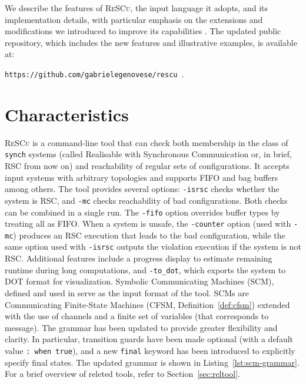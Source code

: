 We describe the features of \textsc{ReSCu}, the input language it adopts,
and its implementation details, with particular emphasis on the
extensions and modifications we introduced to improve its capabilities
\cite{rescuoriginalrepo}. The updated public repository, which includes
the new features and illustrative examples, is available at:
\begin{center}
\verb|https://github.com/gabrielegenovese/rescu|~\cite{rescurepo}.
\end{center}

\section{Characteristics}
\textsc{ReSCu} is a command-line tool that can check both membership in the 
class of \verb|synch| systems (called Realisable with Synchronous Communication 
or, in brief, RSC from now on) and reachability of regular sets of configurations. It 
accepts input systems with arbitrary topologies and supports FIFO and 
bag buffers among others. The tool provides several options: 
\verb|-isrsc| checks whether the system is RSC, and \verb|-mc| checks reachability of 
bad configurations. Both checks can be combined in a single run. The \verb|-fifo| option 
overrides buffer types by treating all as FIFO. When a system is unsafe, the 
\verb|-counter| option (used with \verb|-mc|) produces an RSC execution that leads 
to the bad configuration, while the same option used with \verb|-isrsc| outputs the %
violation execution if the system is not RSC. Additional features include 
a progress display to estimate remaining runtime during long computations, and 
\verb|-to_dot|, which exports the system to DOT format for visualization.
Symbolic Communicating Machines (SCM), defined and used in \cite[Definition 5.1]{le2008abstract}
serve as the input format of the tool. SCMs are Communicating 
Finite-State Machines (CFSM, Definition~\ref{def:cfsm}) 
extended with the use of channels and a finite set of variables (that 
corresponds to message).
The grammar has been updated to provide greater flexibility and clarity. In
particular, transition guards have been made optional (with a default value
\verb|: when true|), and a new \verb|final| keyword has been introduced to
explicitly specify final states. The updated grammar is shown in
Listing~\ref{lst:scm-grammar}. 
For a brief overview of releted tools, refer to Section~\ref{sec:reltool}.

